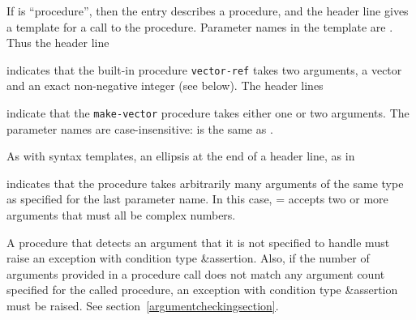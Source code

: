 If  is ``procedure'', then the entry describes a procedure, and
the header line gives a template for a call to the procedure.  Parameter
names in the template are .  Thus the header line

\noindent{}\unpenalty

indicates that the built-in procedure {\tt vector-ref} takes
two arguments, a vector  and an exact non-negative integer
 (see below).  The header lines

\noindent%
\unpenalty

indicate that the {\tt make-vector} procedure takes
either one or two arguments.  The parameter names are
case-insensitive:  is the same as .

As with syntax templates, an ellipsis \dotsfoo{} at the end of a header
line, as in

\noindent{}\unpenalty

indicates that the procedure takes arbitrarily many arguments of the
same type as specified for the last parameter name.  In this case,
{\cf =} accepts two or more arguments that must all be complex
numbers.

\label{typeconventions}
A procedure that detects an argument that it is not specified to
handle must raise an exception with condition type
{\cf\&assertion}.  Also, if the
number of arguments provided in a procedure call does not match any
argument count specified for the called procedure, an exception with
condition type {\cf\&assertion} must be raised.
See section~\ref{argumentcheckingsection}.

